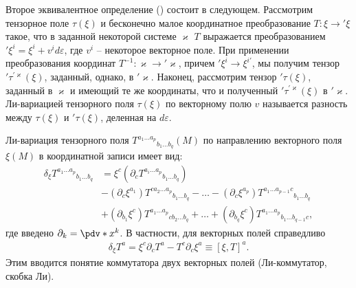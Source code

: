     Второе эквивалентное определение (\cite{lie_derivative_theory}) состоит в следующем. Рассмотрим тензорное поле $\tau(\xi)$ и бесконечно малое координатное преобразование $T: \xi \rightarrow {'\xi}$ такое, что в заданной некоторой системе $\varkappa$ $T$ выражается преобразованием $'\xi^i = \xi^i + v^i d\varepsilon$, где $v^i$ -- некоторое векторное поле. При применении преобразования координат $T^{-1}: \varkappa \rightarrow {'\varkappa}$, причем $'\xi^i \rightarrow \xi^{i'}$, мы получим тензор $'\tau^{'\varkappa}(\xi)$, заданный, однако, в $'\varkappa$. Наконец, рассмотрим тензор $'\tau(\xi)$, заданный в $\varkappa$ и имеющий те же координаты, что и полученный $'\tau^{'\varkappa}(\xi)$ в $'\varkappa$. Ли-вариацией тензорного поля $\tau(\xi)$ по векторному полю $v$ называется разность между $\tau(\xi)$ и $'\tau(\xi)$, деленная на $d\varepsilon$.

    Ли-вариация тензорного поля ${T^{a_1 \dots a_p}}_{b_1 \dots b_q}(M)$ по направлению векторного поля $\xi(M)$ в координатной записи имеет вид:
    \begin{equation}\begin{aligned}
        \delta_\xi {T^{a_1 \dots a_p}}_{b_1 \dots b_q}
            &= \xi^c \left( \partial_c {T^{a_i \dots a_p}}_{b_1 \dots b_q} \right) \\
            &- \left( \partial_{c} \xi^{a_1} \right) {T^{c a_2 \dots a_p}}_{b_1 \dots b_q} - \dots
                - \left( \partial_{c} \xi^{a_p} \right) {T^{a_1 \dots a_{p-1} c}}_{b_1 \dots b_q} \\
            &+ \left( \partial_{b_1} \xi^c \right) {T^{a_1 \dots a_p}}_{c b_2 \dots b_q} + \dots
                + \left( \partial_{b_q} \xi^c \right) {T^{a_1 \dots a_p}}_{b_1 \dots b_{q-1} c} ,
    \end{aligned}\end{equation}
    где введено $\partial_k = \pdv*{x^k}$. В частности, для векторных полей справедливо
    \begin{equation}\begin{aligned}\label{eq:vector_field_commutator}
        \delta_\xi T^a
            = \xi^c \partial_c T^a - T^c \partial_{c} \xi^a
            \equiv [\xi, T]^a.
    \end{aligned}\end{equation}
    Этим вводится понятие коммутатора двух векторных полей (Ли-коммутатор, скобка Ли).

